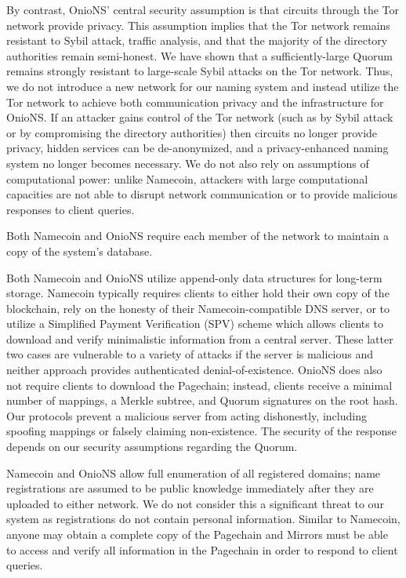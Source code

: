 \documentclass[USenglish,oneside,twocolumn]{article}
\begin{document}
By contrast, OnioNS' central security assumption is that circuits through the Tor network provide privacy. This assumption implies that the Tor network remains resistant to Sybil attack, traffic analysis, and that the majority of the directory authorities remain semi-honest. We have shown that a sufficiently-large Quorum remains strongly resistant to large-scale Sybil attacks on the Tor network. Thus, we do not introduce a new network for our naming system and instead utilize the Tor network to achieve both communication privacy and the infrastructure for OnioNS. If an attacker gains control of the Tor network (such as by Sybil attack or by compromising the directory authorities) then circuits no longer provide privacy, hidden services can be de-anonymized, and a privacy-enhanced naming system no longer becomes necessary. We do not also rely on assumptions of computational power: unlike Namecoin, attackers with large computational capacities are not able to disrupt network communication or to provide malicious responses to client queries.

Both Namecoin and OnioNS require each member of the network to maintain a copy of the system's database. 

Both Namecoin and OnioNS utilize append-only data structures for long-term storage. Namecoin typically requires clients to either hold their own copy of the blockchain, rely on the honesty of their Namecoin-compatible DNS server, or to utilize a Simplified Payment Verification \cite{nakamoto2008bitcoin} (SPV) scheme which allows clients to download and verify minimalistic information from a central server. These latter two cases are vulnerable to a variety of attacks if the server is malicious and neither approach provides authenticated denial-of-existence. OnioNS does also not require clients to download the Pagechain; instead, clients receive a minimal number of mappings, a Merkle subtree, and Quorum signatures on the root hash. Our protocols prevent a malicious server from acting dishonestly, including spoofing mappings or falsely claiming non-existence. The security of the response depends on our security assumptions regarding the Quorum.

Namecoin and OnioNS allow full enumeration of all registered domains; name registrations are assumed to be public knowledge immediately after they are uploaded to either network. We do not consider this a significant threat to our system as registrations do not contain personal information. Similar to Namecoin, anyone may obtain a complete copy of the Pagechain and Mirrors must be able to access and verify all information in the Pagechain in order to respond to client queries.
\end{document}
